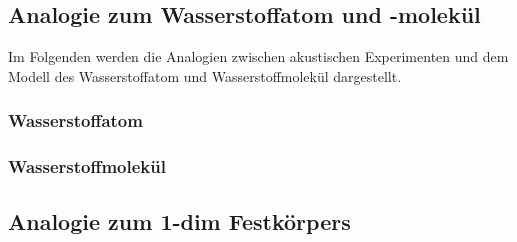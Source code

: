 \subsection{Analogie zum Wasserstoffatom und -molekül}
\label{sec:analogien}

Im Folgenden werden die Analogien zwischen akustischen Experimenten und dem Modell des Wasserstoffatom und Wasserstoffmolekül dargestellt.

\subsubsection{Wasserstoffatom}
\label{sec:ana-H}



\subsubsection{Wasserstoffmolekül}
\label{sec:ana-H2}



\subsection{Analogie zum 1-dim Festkörpers}
\label{ana-fest}

